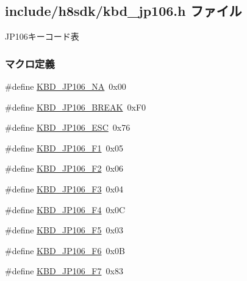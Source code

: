 \subsection{include/h8sdk/kbd\+\_\+jp106.h ファイル}
\label{kbd__jp106_8h}


J\+P106キーコード表  


\subsubsection*{マクロ定義}
\begin{DoxyCompactItemize}
\item 
\#define \hyperlink{kbd__jp106_8h_a20f9302fe854d2e67c78e191dbbe20b1_a20f9302fe854d2e67c78e191dbbe20b1}{K\+B\+D\+\_\+\+J\+P106\+\_\+\+N\+A}~0x00
\item 
\#define \hyperlink{kbd__jp106_8h_a8ff8c2fdf7a91dddb30893085056b673_a8ff8c2fdf7a91dddb30893085056b673}{K\+B\+D\+\_\+\+J\+P106\+\_\+\+B\+R\+E\+A\+K}~0x\+F0
\item 
\#define \hyperlink{kbd__jp106_8h_a142edc31d09a2a50a06cb4fb602db437_a142edc31d09a2a50a06cb4fb602db437}{K\+B\+D\+\_\+\+J\+P106\+\_\+\+E\+S\+C}~0x76
\item 
\#define \hyperlink{kbd__jp106_8h_a1f87d5a6cfd04922b55d70199b8bda2f_a1f87d5a6cfd04922b55d70199b8bda2f}{K\+B\+D\+\_\+\+J\+P106\+\_\+\+F1}~0x05
\item 
\#define \hyperlink{kbd__jp106_8h_a7b175f4587574fa07bcaf916d422acb5_a7b175f4587574fa07bcaf916d422acb5}{K\+B\+D\+\_\+\+J\+P106\+\_\+\+F2}~0x06
\item 
\#define \hyperlink{kbd__jp106_8h_aed323fcbb885ecbc8305f5455aa55098_aed323fcbb885ecbc8305f5455aa55098}{K\+B\+D\+\_\+\+J\+P106\+\_\+\+F3}~0x04
\item 
\#define \hyperlink{kbd__jp106_8h_af07f3d6ae4becd24f1234e61aa98a6d3_af07f3d6ae4becd24f1234e61aa98a6d3}{K\+B\+D\+\_\+\+J\+P106\+\_\+\+F4}~0x0\+C
\item 
\#define \hyperlink{kbd__jp106_8h_a5f12976a8e9f142fb88389d4cd9ed790_a5f12976a8e9f142fb88389d4cd9ed790}{K\+B\+D\+\_\+\+J\+P106\+\_\+\+F5}~0x03
\item 
\#define \hyperlink{kbd__jp106_8h_adbe13258d492fec351eeeb9289288720_adbe13258d492fec351eeeb9289288720}{K\+B\+D\+\_\+\+J\+P106\+\_\+\+F6}~0x0\+B
\item 
\#define \hyperlink{kbd__jp106_8h_a7ef84f860922d9da6f3c8f2ab1bf1303_a7ef84f860922d9da6f3c8f2ab1bf1303}{K\+B\+D\+\_\+\+J\+P106\+\_\+\+F7}~0x83
\item 

\end{DoxyCompactItemize}
